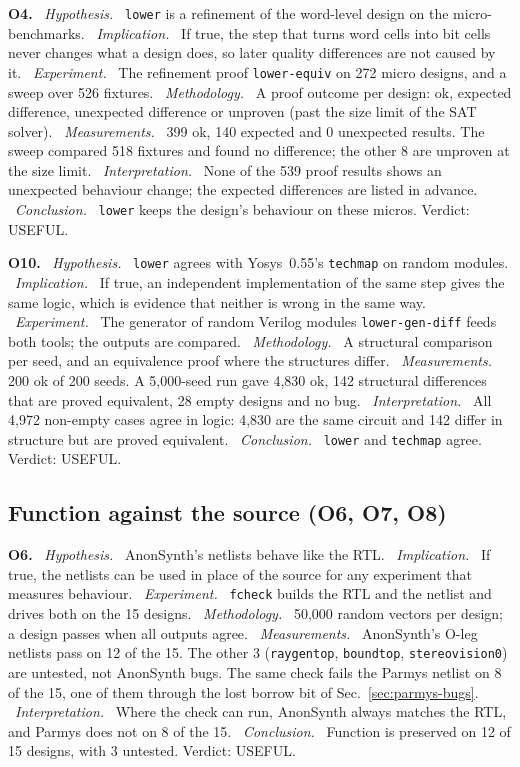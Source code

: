 \documentclass[conference]{IEEEtran}
\newcommand{\code}[1]{\texttt{#1}}
\newcommand{\argid}[1]{\par\smallskip\noindent\textbf{#1.}}
\newcommand{\ah}[1]{\ \textit{#1.}\ }
\begin{document}
\argid{O4}
\ah{Hypothesis} \code{lower} is a refinement of the word-level design on the micro-benchmarks.
\ah{Implication} If true, the step that turns word cells into bit cells never changes what a design does, so later quality differences are not caused by it.
\ah{Experiment} The refinement proof \code{lower-equiv} on 272 micro designs, and a sweep over 526 fixtures.
\ah{Methodology} A proof outcome per design: ok, expected difference, unexpected difference or unproven (past the size limit of the SAT solver).
\ah{Measurements} 399 ok, 140 expected and 0 unexpected results. The sweep compared 518 fixtures and found no difference; the other 8 are unproven at the size limit.
\ah{Interpretation} None of the 539 proof results shows an unexpected behaviour change; the expected differences are listed in advance.
\ah{Conclusion} \code{lower} keeps the design's behaviour on these micros. Verdict: USEFUL.

\argid{O10}
\ah{Hypothesis} \code{lower} agrees with Yosys~0.55's \code{techmap} on random modules.
\ah{Implication} If true, an independent implementation of the same step gives the same logic, which is evidence that neither is wrong in the same way.
\ah{Experiment} The generator of random Verilog modules \code{lower-gen-diff} feeds both tools; the outputs are compared.
\ah{Methodology} A structural comparison per seed, and an equivalence proof where the structures differ.
\ah{Measurements} 200 ok of 200 seeds. A 5,000-seed run gave 4,830 ok, 142 structural differences that are proved equivalent, 28 empty designs and no bug.
\ah{Interpretation} All 4,972 non-empty cases agree in logic: 4,830 are the same circuit and 142 differ in structure but are proved equivalent.
\ah{Conclusion} \code{lower} and \code{techmap} agree. Verdict: USEFUL.

\subsection{Function against the source (O6, O7, O8)}

\argid{O6}
\ah{Hypothesis} AnonSynth's netlists behave like the RTL.
\ah{Implication} If true, the netlists can be used in place of the source for any experiment that measures behaviour.
\ah{Experiment} \code{fcheck} builds the RTL and the netlist and drives both on the 15 designs.
\ah{Methodology} 50,000 random vectors per design; a design passes when all outputs agree.
\ah{Measurements} AnonSynth's O-leg netlists pass on 12 of the 15. The other 3 (\code{raygentop}, \code{boundtop}, \code{stereovision0}) are untested, not AnonSynth bugs. The same check fails the Parmys netlist on 8 of the 15, one of them through the lost borrow bit of Sec.~\ref{sec:parmys-bugs}.
\ah{Interpretation} Where the check can run, AnonSynth always matches the RTL, and Parmys does not on 8 of the 15.
\ah{Conclusion} Function is preserved on 12 of 15 designs, with 3 untested. Verdict: USEFUL.
\end{document}
